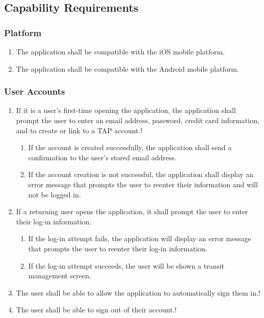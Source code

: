 \subsection{Capability Requirements}

	\subsubsection{Platform}\begin{enumerate}
		\item The application shall be compatible with the iOS mobile platform.
		\item The application shall be compatible with the Android mobile platform.
	\end{enumerate}
	
	\subsubsection{User Accounts}\begin{enumerate}
		\item If it is a user’s first-time opening the application, the application shall prompt the user to enter an email address, password, credit card information, and to create or link to a TAP account.!
		\begin{enumerate}
			\item If the account is created successfully, the application shall send a confirmation to the user’s stored email address.
			\item If the account creation is not successful, the application shall display an error message that prompts the user to reenter their information and will not be logged in.
		\end{enumerate}
		\item If a returning user opens the application, it shall prompt the user to enter their log-in information.
			\begin{enumerate}
				\item If the log-in attempt fails, the application will display an error message that prompts the user to reenter their log-in information.
				\item If the log-in attempt succeeds, the user will be shown a transit management screen.
			\end{enumerate}
		\item The user shall be able to allow the application to automatically sign them in.!
		\item The user shall be able to sign out of their account.!
	\end{enumerate}
	
